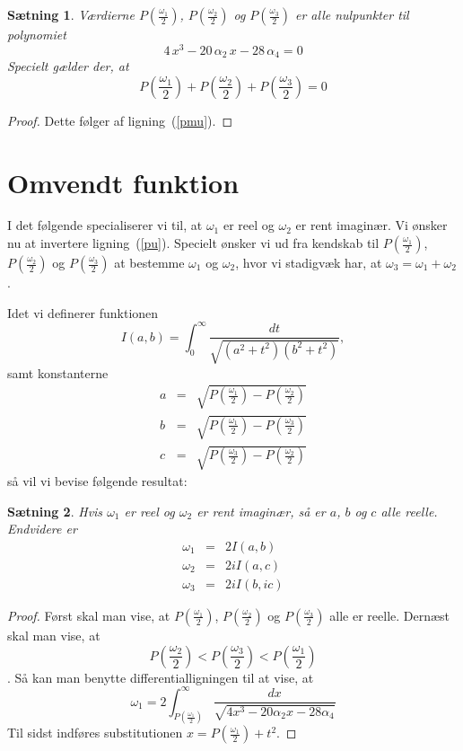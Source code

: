 \documentclass[12pt,oneside,a4paper]{article}
\newcommand{\be}{\begin{equation}}
\newcommand{\ee}{\end{equation}}
\newcommand{\bea}{\begin{eqnarray}}
\newcommand{\eea}{\end{eqnarray}}
\newtheorem{thm}{Sætning}[section]
\begin{document}
\begin{thm}
    Værdierne $P(\frac{\omega_1}{2})$, $P(\frac{\omega_2}{2})$ og $P(\frac{\omega_3}{2})$
    er alle nulpunkter til polynomiet
    $$
    4\,x^3 - 20\,\alpha_2 \,x - 28 \,\alpha_4 = 0
    $$
    Specielt gælder der, at 
    $$
    P\left(\frac{\omega_1}{2}\right) + P\left(\frac{\omega_2}{2}\right) + P\left(\frac{\omega_3}{2}\right) = 0
    $$
\end{thm}
\begin{proof}
    Dette følger af ligning~(\ref{pmu}).
\end{proof}

\section{Omvendt funktion}
I det følgende specialiserer vi til, at $\omega_1$ er reel og $\omega_2$ er
rent imaginær.  Vi ønsker nu at invertere ligning~(\ref{pu}). Specielt ønsker
vi ud fra
kendskab til $P\left(\frac{\omega_1}{2}\right)$,
$P\left(\frac{\omega_2}{2}\right)$ og $P\left(\frac{\omega_3}{2}\right)$ at
bestemme $\omega_1$ og $\omega_2$, hvor vi stadigvæk har, at $\omega_3 = \omega_1 + \omega_2$.

Idet vi
definerer funktionen
\be
I(a, b) = \int_0^\infty \frac{dt}{\sqrt{(a^2+t^2)(b^2+t^2)}},
\ee
samt konstanterne
\bea
a &=& \sqrt{P\left(\frac{\omega_1}{2}\right)-P\left(\frac{\omega_2}{2}\right)} \\
b &=& \sqrt{P\left(\frac{\omega_1}{2}\right)-P\left(\frac{\omega_3}{2}\right)} \\
c &=& \sqrt{P\left(\frac{\omega_3}{2}\right)-P\left(\frac{\omega_2}{2}\right)}
\eea
så vil vi bevise følgende resultat:
\begin{thm}
    Hvis $\omega_1$ er reel og $\omega_2$ er rent imaginær, så er $a$, $b$ og $c$ alle reelle.
    Endvidere er 
    \bea
    \omega_1 &=& 2 I(a,b) \\
    \omega_2 &=& 2i I(a,c) \\
    \omega_3 &=& 2i I(b,ic)
    \eea
\end{thm}
\begin{proof}
    Først skal man vise, at 
    $P\left(\frac{\omega_1}{2}\right)$,
    $P\left(\frac{\omega_2}{2}\right)$ og
    $P\left(\frac{\omega_3}{2}\right)$ alle er reelle.
    Dernæst skal man vise, at 
    $$
    P\left(\frac{\omega_2}{2}\right) <
    P\left(\frac{\omega_3}{2}\right) <
    P\left(\frac{\omega_1}{2}\right)
    $$.
    Så kan man benytte differentialligningen til at vise, at
    $$
    \omega_1 = 2 \int_{P\left(\frac{\omega_1}{2}\right)}^\infty 
    \frac{dx}{\sqrt{4x^3-20\alpha_2x-28\alpha_4}}
    $$
    Til sidst indføres substitutionen $x = P\left(\frac{\omega_1}{2}\right) + t^2$.
    
\end{proof}
\end{document}
